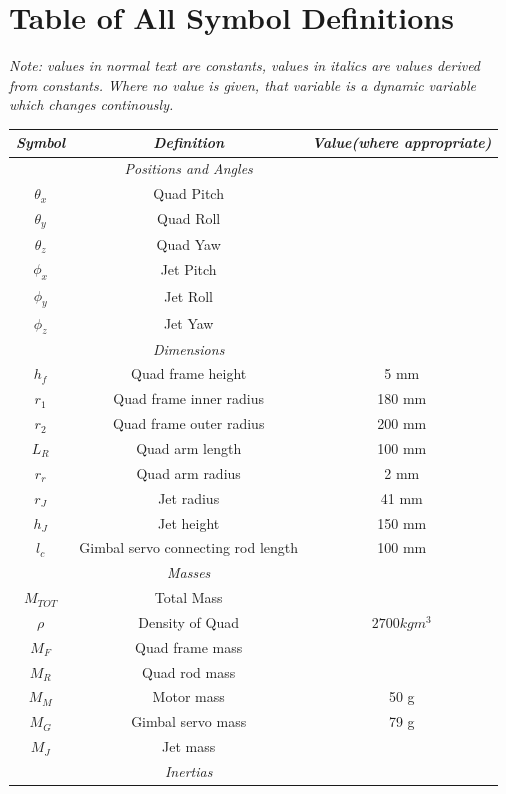 \documentclass[11pt]{article}
\begin{document}
\section{Table of All Symbol Definitions}
\begin{center}
    \emph{Note: values in normal text are constants, values in italics are values derived from constants. Where no value is given, that variable is a dynamic variable which changes continously.}
\begin{longtable}{|ccc|}
    \hline
    \emph{Symbol} & \emph{Definition} & \emph{Value(where appropriate)} \\
    \hline \endhead
    & \emph{Positions and Angles} & \\
    \hline
    $\theta_x$ & Quad Pitch & \\
    $\theta_y$ & Quad Roll & \\
    $\theta_z$ & Quad Yaw & \\
    $\phi_x$ & Jet Pitch & \\
    $\phi_y$ & Jet Roll & \\
    $\phi_z$ & Jet Yaw & \\
    \hline
    & \emph{Dimensions} & \\
    \hline
    $h_f$ & Quad frame height & 5 mm \\
    $r_1$ & Quad frame inner radius & 180 mm \\
    $r_2$ & Quad frame outer radius & 200 mm \\
    $L_R$ & Quad arm length & 100 mm \\
    $r_r$ & Quad arm radius & 2 mm \\
    $r_J$ & Jet radius & 41 mm \\
    $h_J$ & Jet height & 150 mm \\
    $l_c$ & Gimbal servo connecting rod length & 100 mm \\
    \hline
    & \emph{Masses} & \\
    \hline
    $M_{TOT}$ & Total Mass & \\
    $\rho$ & Density of Quad & $2700 kgm^3$ \\
    $M_F$ & Quad frame mass & \\
    $M_R$ & Quad rod mass & \\
    $M_M$ & Motor mass & 50 g \\
    $M_G$ & Gimbal servo mass & 79 g \\
    $M_J$ & Jet mass & \\
    \hline
    & \emph{Inertias} & \\

\end{longtable}
\end{center}
\end{document}
